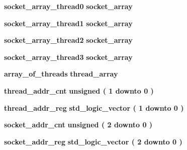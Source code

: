 \begin{DoxyCompactItemize}
\item 
{\bf socket\+\_\+array\+\_\+thread0} {\bfseries {\bfseries {\bf socket\+\_\+array}} \textcolor{vhdlchar}{ }} 
\item 
{\bf socket\+\_\+array\+\_\+thread1} {\bfseries {\bfseries {\bf socket\+\_\+array}} \textcolor{vhdlchar}{ }} 
\item 
{\bf socket\+\_\+array\+\_\+thread2} {\bfseries {\bfseries {\bf socket\+\_\+array}} \textcolor{vhdlchar}{ }} 
\item 
{\bf socket\+\_\+array\+\_\+thread3} {\bfseries {\bfseries {\bf socket\+\_\+array}} \textcolor{vhdlchar}{ }} 
\item 
{\bf array\+\_\+of\+\_\+threads} {\bfseries {\bfseries {\bf thread\+\_\+array}} \textcolor{vhdlchar}{ }} 
\item 
{\bf thread\+\_\+addr\+\_\+cnt} {\bfseries \textcolor{comment}{unsigned}\textcolor{vhdlchar}{ }\textcolor{vhdlchar}{(}\textcolor{vhdlchar}{ }\textcolor{vhdlchar}{ } \textcolor{vhdldigit}{1} \textcolor{vhdlchar}{ }\textcolor{keywordflow}{downto}\textcolor{vhdlchar}{ }\textcolor{vhdlchar}{ } \textcolor{vhdldigit}{0} \textcolor{vhdlchar}{ }\textcolor{vhdlchar}{)}\textcolor{vhdlchar}{ }} 
\item 
{\bf thread\+\_\+addr\+\_\+reg} {\bfseries \textcolor{comment}{std\+\_\+logic\+\_\+vector}\textcolor{vhdlchar}{ }\textcolor{vhdlchar}{(}\textcolor{vhdlchar}{ }\textcolor{vhdlchar}{ } \textcolor{vhdldigit}{1} \textcolor{vhdlchar}{ }\textcolor{keywordflow}{downto}\textcolor{vhdlchar}{ }\textcolor{vhdlchar}{ } \textcolor{vhdldigit}{0} \textcolor{vhdlchar}{ }\textcolor{vhdlchar}{)}\textcolor{vhdlchar}{ }} 
\item 
{\bf socket\+\_\+addr\+\_\+cnt} {\bfseries \textcolor{comment}{unsigned}\textcolor{vhdlchar}{ }\textcolor{vhdlchar}{(}\textcolor{vhdlchar}{ }\textcolor{vhdlchar}{ } \textcolor{vhdldigit}{2} \textcolor{vhdlchar}{ }\textcolor{keywordflow}{downto}\textcolor{vhdlchar}{ }\textcolor{vhdlchar}{ } \textcolor{vhdldigit}{0} \textcolor{vhdlchar}{ }\textcolor{vhdlchar}{)}\textcolor{vhdlchar}{ }} 
\item 
{\bf socket\+\_\+addr\+\_\+reg} {\bfseries \textcolor{comment}{std\+\_\+logic\+\_\+vector}\textcolor{vhdlchar}{ }\textcolor{vhdlchar}{(}\textcolor{vhdlchar}{ }\textcolor{vhdlchar}{ } \textcolor{vhdldigit}{2} \textcolor{vhdlchar}{ }\textcolor{keywordflow}{downto}\textcolor{vhdlchar}{ }\textcolor{vhdlchar}{ } \textcolor{vhdldigit}{0} \textcolor{vhdlchar}{ }\textcolor{vhdlchar}{)}\textcolor{vhdlchar}{ }} 
\item 

\end{DoxyCompactItemize}
